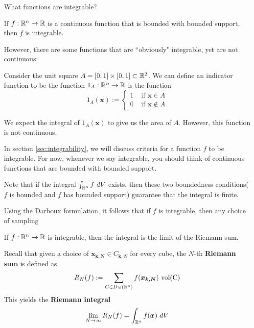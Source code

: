 \begin{motivating}
    What functions are integrable?
\end{motivating}

    \begin{example}
    \begin{theorem}
     If $f : \mathbb{R}^n \to \mathbb{R}$ is a continuous function that is bounded with bounded support, then $f$ is integrable.   
    \end{theorem}
    \end{example}

    
However, there are some functions that are ``obviously" integrable, yet are not continuous:

\begin{example}
    Consider the unit square $A = [0,1] \times [0,1] \subset \mathbb{R}^2$.   We can define an indicator function to be the function $1_A  :\mathbb{R}^n \to \mathbb{R}$ is the function 
    $$1_A(\bm{x}) := \left\{
		\begin{array}{ll}
			1 & \text{ if } \bm{x} \in A \\
			0 & \text{ if } \bm{x} \notin A
		\end{array}
		\right.$$

  We expect the integral of $1_A(\bm{x})$ to give us the area of $A$.  However, this function is not continuous.
\end{example}
    
    In section \ref{sec:integrability}, we will discuss criteria for a function $f$ to be integrable.  For now, whenever we say integrable, you should think of continuous functions that are bounded with bounded support.



\begin{remark}
Note that if the integral $\int_{\R^n} f \ dV$ exists, then these two boundedness conditions($f$ is bounded and $f$ has bounded support) guarantee that the integral is finite.    
\end{remark}



\begin{remark}
    Using the Darboux formulation, it follows that if $f$ is integrable, then any choice of sampling  
\end{remark}

\begin{proposition}\label{prop:riemannisintegrable}
    If $f: \mathbb{R}^n \to \mathbb{R}$ is integrable, then the integral is the limit of the Riemann sum.  

    Recall that given a choice of $\bm{x_{k,N}} \in C_{\bm{k},N}$ for every cube, the $N$-th \textbf{Riemann sum} is defined as 
    $$R_N(f) := \sum_{C \in D_N(\mathbb{R}^n)} f(\bm{x_{k,N}}) \ \textnormal{vol(C)}$$
    This yields the \textbf{Riemann integral}
    $$\lim_{N \to \infty} R_N(f) = \int_{\mathbb{R}^n} f(\bm{x}) \ dV$$
    \end{proposition}

